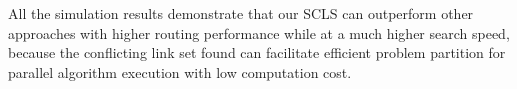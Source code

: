 
All the simulation results demonstrate that our SCLS can outperform other approaches with higher routing performance while at a much higher search speed, because the  conflicting link set found can facilitate efficient problem partition for parallel algorithm execution with low computation cost.

